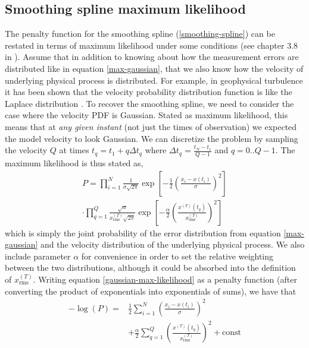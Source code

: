 \documentclass[10pt,journal]{IEEEtran}
\begin{document}
\subsection{Smoothing spline maximum likelihood}
\label{sec:maximum_likelihood}

The penalty function for the smoothing spline (\ref{smoothing-spline}) can be restated in terms of maximum likelihood under some conditions (see chapter 3.8 in \cite{green1994-book}). Assume that in addition to knowing about how the measurement errors are distributed like in equation \ref{max-gaussian}, that we also know how the velocity of underlying physical process is distributed. For example, in geophysical turbulence it has been shown that the velocity probability distribution function is like the Laplace distribution \cite{bracco2000-pf}. To recover the smoothing spline, we need to consider the case where the velocity PDF is Gaussian. Stated as maximum likelihood, this means that at \emph{any given instant} (not just the times of observation) we expected the model velocity to look Gaussian. We can discretize the problem by sampling the velocity $Q$ at times $t_q = t_1 + q \Delta t_q$ where $\Delta t_q=\frac{t_N-t_1}{Q-1}$ and $q=0..Q-1$. The maximum likelihood is thus stated as,
\begin{equation}
\label{gaussian-max-likelihood}
\begin{split}
P =   \prod^N _{i=1}\frac{1}{\sigma \sqrt{2 \pi}}\exp \left[ -\frac{1}{2} \left( \frac{x_i - x(t_i)}{\sigma} \right)^2 \right] \\ \nonumber \cdot  \prod^{Q}_{q=1}\frac{\sqrt{\alpha}}{x^{(T)}_{\textrm{rms}} \sqrt{2 \pi}} \exp \left[  - \frac{\alpha}{2} \left(  \frac{x^{(T)}(t_q)}{x^{(T)}_{\textrm{rms}}} \right)^2 \right]
\end{split}
\end{equation}
which is simply the joint probability of the error distribution from equation \ref{max-gaussian} and the velocity distribution of the underlying physical process. We also include parameter $\alpha$ for convenience in order to set the relative weighting between the two distributions, although it could be absorbed into the definition of $x^{(T)}_{\textrm{rms}}$. Writing equation \ref{gaussian-max-likelihood} as a penalty function (after converting the product of exponentials into exponentials of sums), we have that
\begin{align}
\label{smoothing-spline-log-likelihood}
-\log(P)=& \frac{1}{2}\sum^N _{i=1}  \left( \frac{x_i - x(t_i)}{\sigma} \right)^2 \\ &+ \frac{\alpha}{2} \sum^{Q}_{q=1} \left( \frac{x^{(T)}(t_q)}{x^{(T)}_{\textrm{rms}}} \right)^2 + \textrm{const}
\end{align}
\end{document}
